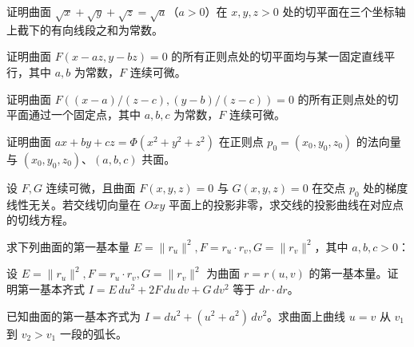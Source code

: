 \noindent\begin{minipage}{\textwidth}
证明曲面 $\sqrt x+\sqrt y+\sqrt z=\sqrt a$（$a>0$）在 $x,y,z>0$ 处的切平面在三个坐标轴上截下的有向线段之和为常数。
\end{minipage}\par\vfill
\newpage
\noindent\begin{minipage}{\textwidth}
证明曲面 $F(x-az,y-bz)=0$ 的所有正则点处的切平面均与某一固定直线平行，其中 $a,b$ 为常数，$F$ 连续可微。
\end{minipage}\par\vfill
\noindent\begin{minipage}{\textwidth}
证明曲面 $F((x-a)/(z-c),(y-b)/(z-c))=0$ 的所有正则点处的切平面通过一个固定点，其中 $a,b,c$ 为常数，$F$ 连续可微。
\end{minipage}\par\vfill
\noindent\begin{minipage}{\textwidth}
证明曲面 $ax+by+cz=\Phi(x^2+y^2+z^2)$ 在正则点 $p_0=(x_0,y_0,z_0)$ 的法向量与 $(x_0,y_0,z_0)$、$(a,b,c)$ 共面。
\end{minipage}\par\vfill
\newpage
\noindent\begin{minipage}{\textwidth}
设 $F,G$ 连续可微，且曲面 $F(x,y,z)=0$ 与 $G(x,y,z)=0$ 在交点 $p_0$ 处的梯度线性无关。若交线切向量在 $Oxy$ 平面上的投影非零，求交线的投影曲线在对应点的切线方程。
\end{minipage}\par\vfill
\noindent\begin{minipage}{\textwidth}
求下列曲面的第一基本量 $E=\|r_u\|^2,F=r_u\cdot r_v,G=\|r_v\|^2$，其中 $a,b,c>0$：
\end{minipage}\par\vfill
\noindent\begin{minipage}{\textwidth}
设 $E=\|r_u\|^2,F=r_u\cdot r_v,G=\|r_v\|^2$ 为曲面 $r=r(u,v)$ 的第一基本量。证明第一基本齐式 $I=E\,du^2+2F\,du\,dv+G\,dv^2$ 等于 $dr\cdot dr$。
\end{minipage}\par\vfill
\newpage
\noindent\begin{minipage}{\textwidth}
已知曲面的第一基本齐式为 $I=du^2+(u^2+a^2)\,dv^2$。求曲面上曲线 $u=v$ 从 $v_1$ 到 $v_2>v_1$ 一段的弧长。
\end{minipage}\par\vfill
